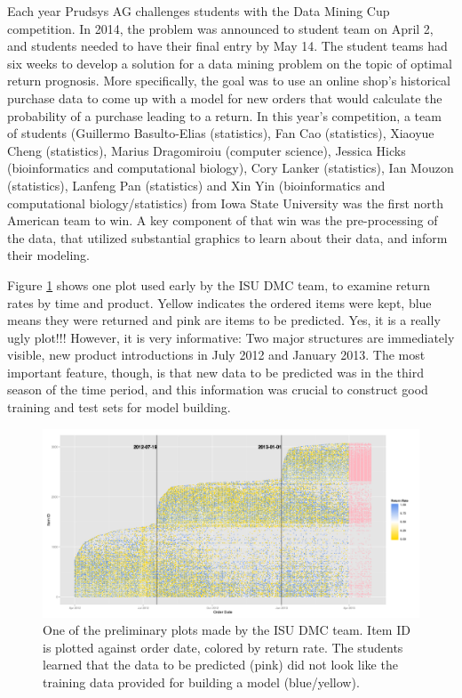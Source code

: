 \documentclass{article}
\begin{document}
Each year Prudsys AG  challenges students with  the Data Mining Cup competition. In 2014, the problem was announced to student team on April 2, and students needed to have their final entry by May 14. The student teams had six weeks to develop a solution for a data mining problem on the topic of optimal return prognosis. More specifically, the goal was to use an online shop's historical purchase data to come up with a model for new orders that would calculate the probability of a purchase leading to a return. In this year's competition, a team of students (Guillermo Basulto-Elias (statistics), Fan Cao (statistics), Xiaoyue Cheng (statistics), Marius Dragomiroiu (computer science), Jessica Hicks (bioinformatics and computational biology), Cory Lanker (statistics), Ian Mouzon (statistics), Lanfeng Pan (statistics) and Xin Yin (bioinformatics and computational biology/statistics) from Iowa State University was the first north American team to win. A key component of that win was the pre-processing of the data, that utilized substantial graphics to learn about their data, and inform their modeling.

Figure \ref{DMC1} shows one plot used early by the ISU DMC team, to examine return rates by time and product. Yellow indicates the ordered items were kept, blue means they were returned and pink are items to be predicted. Yes, it is a really ugly plot!!! However, it is very informative: Two major structures are immediately visible, new product introductions in July 2012 and January 2013. The most important feature, though, is that new data to be predicted was in the third season of the time period, and this information was crucial to construct good training and test sets for model building.

\begin{figure}[htp]
\centerline{\includegraphics[width=7in]{images/orderDate_itemID.png}}
\caption{One of the preliminary plots made by the ISU DMC team. Item ID is plotted against order date, colored by return rate. The students learned that the data to be predicted (pink) did not look like the training data provided for building a model (blue/yellow).}
\label{DMC1}
\end{figure}
\end{document}
